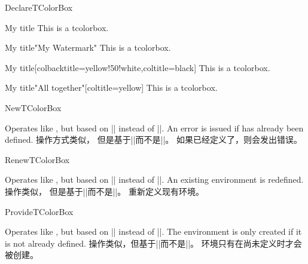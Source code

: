 \begin{docCommand}{DeclareTColorBox}{}
\begin{dispExample}
\begin{mybox}[blue]{My title}
This is a tcolorbox.
\end{mybox}

\begin{mybox}[green]{My title}"My Watermark"
This is a tcolorbox.
\end{mybox}

\begin{mybox}[yellow]{My title}[colbacktitle=yellow!50!white,coltitle=black]
This is a tcolorbox.
\end{mybox}

\begin{mybox}[purple]{My title}"All together"[coltitle=yellow]
This is a tcolorbox.
\end{mybox}
\end{dispExample}
\end{docCommand}

\begin{docCommand}{NewTColorBox}{}
\begin{stripedbox}
Operates like , 
but based on |\NewDocumentEnvironment| instead of |\DeclareDocumentEnvironment|.
An error is issued if  has already been defined.
\tcblower
操作方式类似，%
但是基于|\NewDocumentEnvironment|而不是|\DeclareDocumentEnvironment|。%
如果已经定义了，则会发出错误。
\end{stripedbox}
\end{docCommand}

\begin{docCommand}{RenewTColorBox}{}
\begin{stripedbox}
Operates like , but based on |\RenewDocumentEnvironment| instead of |\DeclareDocumentEnvironment|.
An existing environment is redefined.
\tcblower
操作类似，%
但是基于|\RenewDocumentEnvironment|而不是|\DeclareDocumentEnvironment|。%
重新定义现有环境。
\end{stripedbox}
\end{docCommand}

\begin{docCommand}{ProvideTColorBox}{}
\begin{stripedbox}
Operates like , but based on |\ProvideDocumentEnvironment| instead of |\DeclareDocumentEnvironment|.
The environment  is only created if it is not already defined.
\tcblower
操作类似，但基于|\ProvideDocumentEnvironment|而不是|\DeclareDocumentEnvironment|。
环境只有在尚未定义时才会被创建。
\end{stripedbox}
\end{docCommand}

